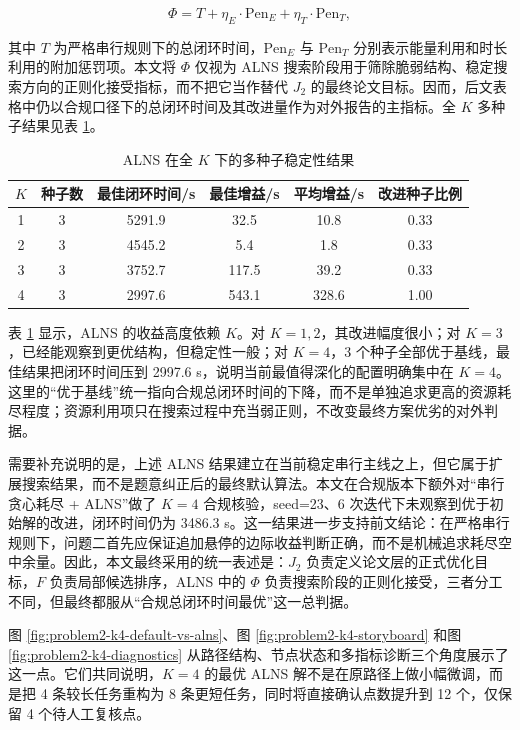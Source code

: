 \documentclass[12pt]{article}
\begin{document}
\begin{equation}
\Phi = T + \eta_E \cdot \mathrm{Pen}_E + \eta_T \cdot \mathrm{Pen}_T,
\end{equation}

其中 $T$ 为严格串行规则下的总闭环时间，$\mathrm{Pen}_E$ 与 $\mathrm{Pen}_T$ 分别表示能量利用和时长利用的附加惩罚项。本文将 $\Phi$ 仅视为 ALNS 搜索阶段用于筛除脆弱结构、稳定搜索方向的正则化接受指标，而不把它当作替代 $J_2$ 的最终论文目标。因而，后文表格中仍以合规口径下的总闭环时间及其改进量作为对外报告的主指标。全 $K$ 多种子结果见表 \ref{tab:problem2-alns-stability-fullk}。

\begin{table}[H]
\centering
\caption{ALNS 在全 $K$ 下的多种子稳定性结果}
\label{tab:problem2-alns-stability-fullk}
\begin{tabular}{cccccc}
\toprule
$K$ & 种子数 & 最佳闭环时间/s & 最佳增益/s & 平均增益/s & 改进种子比例 \\
\midrule
1 & 3 & 5291.9 & 32.5 & 10.8 & 0.33 \\
2 & 3 & 4545.2 & 5.4 & 1.8 & 0.33 \\
3 & 3 & 3752.7 & 117.5 & 39.2 & 0.33 \\
4 & 3 & 2997.6 & 543.1 & 328.6 & 1.00 \\
\bottomrule
\end{tabular}
\end{table}

表 \ref{tab:problem2-alns-stability-fullk} 显示，ALNS 的收益高度依赖 $K$。对 $K=1,2$，其改进幅度很小；对 $K=3$，已经能观察到更优结构，但稳定性一般；对 $K=4$，3 个种子全部优于基线，最佳结果把闭环时间压到 2997.6 s，说明当前最值得深化的配置明确集中在 $K=4$。这里的“优于基线”统一指向合规总闭环时间的下降，而不是单独追求更高的资源耗尽程度；资源利用项只在搜索过程中充当弱正则，不改变最终方案优劣的对外判据。

需要补充说明的是，上述 ALNS 结果建立在当前稳定串行主线之上，但它属于扩展搜索结果，而不是题意纠正后的最终默认算法。本文在合规版本下额外对“串行贪心耗尽 + ALNS”做了 $K=4$ 合规核验，seed=23、6 次迭代下未观察到优于初始解的改进，闭环时间仍为 3486.3 s。这一结果进一步支持前文结论：在严格串行规则下，问题二首先应保证追加悬停的边际收益判断正确，而不是机械追求耗尽空中余量。因此，本文最终采用的统一表述是：$J_2$ 负责定义论文层的正式优化目标，$F$ 负责局部候选排序，ALNS 中的 $\Phi$ 负责搜索阶段的正则化接受，三者分工不同，但最终都服从“合规总闭环时间最优”这一总判据。

图 \ref{fig:problem2-k4-default-vs-alns}、图 \ref{fig:problem2-k4-storyboard} 和图 \ref{fig:problem2-k4-diagnostics} 从路径结构、节点状态和多指标诊断三个角度展示了这一点。它们共同说明，$K=4$ 的最优 ALNS 解不是在原路径上做小幅微调，而是把 4 条较长任务重构为 8 条更短任务，同时将直接确认点数提升到 12 个，仅保留 4 个待人工复核点。
\end{document}
